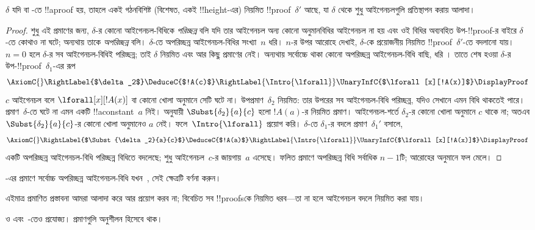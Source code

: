 \documentclass[../../../include/open-logic-section]{subfiles}
\begin{document}
\begin{prop}
$\delta$ যদি  বা -তে !!a{proof} হয়,
তাহলে একই গঠনবিশিষ্ট (বিশেষত, একই !!{height}-এর)
নিয়মিত !!{proof}~$\delta'$ আছে, যা $\delta$ থেকে
শুধু আইগেনচলগুলি প্রতিস্থাপন করায় আলাদা।
\end{prop}

\begin{proof}
শুধু এই প্রমাণের জন্য, $\delta$-র কোনো আইগেনচল-বিধিকে
\emph{পরিচ্ছন্ন} বলি যদি তার আইগেনচল অন্য কোনো অনুমানবিধির
আইগেনচল না হয় এবং ওই বিধির অব্যবহিত উপ-!!{proof}-র
বাইরে $\delta$-তে কোথাও না ঘটে; অন্যথায় তাকে
\emph{অপরিচ্ছন্ন} বলি। $\delta$-তে অপরিচ্ছন্ন আইগেনচল-বিধির
সংখ্যা~$n$ ধরি। $n$-র উপর আরোহে দেখাই, $\delta$-কে
প্রয়োজনীয় নিয়মিত !!{proof}~$\delta'$-তে বদলানো যায়।
$n=0$ হলে $\delta$-র সব আইগেনচল-বিধিই পরিচ্ছন্ন; তাই $\delta$
নিয়মিত এবং আর কিছু প্রমাণের নেই। অন্যথায় সর্বোচ্চে
থাকা কোনো অপরিচ্ছন্ন আইগেনচল-বিধি বাছি, ধরি
\Intro{\lforall}। তাতে শেষ হওয়া $\delta$-র
উপ-!!{proof}~$\delta_1$-এর রূপ
    \[
    \AxiomC{}
    \RightLabel{$\delta_2$}
    \DeduceC{$!A(c)$}
    \RightLabel{\Intro{\lforall}}
    \UnaryInfC{$\lforall[x][!A(x)]$}
    \DisplayProof
    \]
$c$ আইগেনচল বলে $\lforall[x][!A(x)]$ বা কোনো
খোলা অনুমানে সেটি ঘটে না। উপপ্রমাণ~$\delta_2$
নিয়মিত: তার উপরের সব আইগেনচল-বিধি পরিচ্ছন্ন,
যদিও সেখানে এমন বিধি থাকতেই পারে। প্রমাণ~$\delta$-তে
ঘটে না এমন একটি !!a{constant}~$a$ নিই।
 অনুযায়ী
$\Subst{\delta_2}{a}{c}$ হলো $!A(a)$-র নিয়মিত প্রমাণ।
আইগেনচল-শর্তে $\delta_2$-র কোনো খোলা অনুমানে $c$
থাকে না; অতএব $\Subst{\delta_2}{a}{c}$-র কোনো খোলা
অনুমানেও $a$ নেই। ফলে~$\Intro{\lforall}$ প্রয়োগ করি।
$\delta$-তে $\delta_1$-র বদলে প্রমাণ~$\delta_1'$ বসালে,
    \[
    \AxiomC{}
    \RightLabel{$\Subst{\delta_2}{a}{c}$}
    \DeduceC{$!A(a)$}
    \RightLabel{\Intro{\lforall}}
    \UnaryInfC{$\lforall[x][!A(x)]$}
    \DisplayProof
    \]
একটি অপরিচ্ছন্ন আইগেনচল-বিধি পরিচ্ছন্ন বিধিতে বদলেছে;
শুধু আইগেনচল~$c$-র জায়গায়~$a$ এসেছে। ফলিত
প্রমাণে অপরিচ্ছন্ন বিধি সর্বাধিক $n-1$টি; আরোহের অনুমানে ফল মেলে।
\end{proof}

\begin{prob}
-এর প্রমাণে সর্বোচ্চ অপরিচ্ছন্ন আইগেনচল-বিধি
যখন~\Elim{\lexists}, সেই ক্ষেত্রটি বর্ণনা করুন।
\end{prob}

এইমাত্র প্রমাণিত প্রস্তাবনা আমরা আলাদা করে আর প্রয়োগ
করব না; বিবেচিত সব !!{proof}sকে নিয়মিত ধরব—তা না
হলে আইগেনচল বদলে নিয়মিত করা যায়।

 ও 
 এবং~-তেও প্রযোজ্য। প্রমাণগুলি
অনুশীলন হিসেবে থাক।
\end{document}
